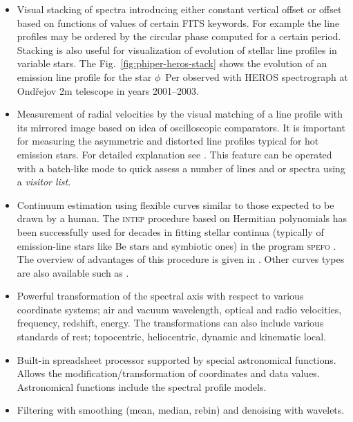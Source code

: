 \documentclass[final,authoryear,5p,times,twocolumn]{elsarticle}
\begin{document}
\begin{itemize}

\item Visual stacking of spectra introducing either constant vertical offset
  or offset based on functions of values of certain FITS keywords. For example
  the line profiles may be ordered by the circular phase computed for a
  certain period. Stacking is also useful for visualization of evolution of
  stellar line profiles in variable stars.  The
  Fig.~\ref{fig:phiper-heros-stack} shows the evolution of an emission line
  profile for the star $\phi$~Per observed with HEROS spectrograph at
  Ond\v{r}ejov 2m telescope in years 2001--2003.

\item Measurement of radial velocities by the visual matching of a line
  profile with its mirrored image based on idea of oscilloscopic comparators.
  It is important for measuring the asymmetric and distorted line profiles
  typical for hot emission stars. For detailed explanation see
  \citet{2007IAUS..240..486P}. This feature can be operated with a batch-like
  mode to quick assess a number of lines and or spectra using a \emph{visitor list}.

\item Continuum estimation using flexible curves similar to those expected to
  be drawn by a human. The \textsc{intep} procedure based on Hermitian polynomials
  \citep{1982PDAO...16...67H} has been successfully used for decades in
  fitting stellar continua (typically of emission-line stars like Be stars and
  symbiotic ones) in the program \textsc{spefo} \citep{1996ASPC..101..187S}. The
  overview of advantages of this procedure is given in
  \citet{2008asvo.proc...97S}. Other curves types are also available such as
  \citet{Akima:1970:NMI:321607.321609}.

\item Powerful transformation of the spectral axis with respect to various
  coordinate systems; air and vacuum wavelength, optical and radio velocities,
  frequency, redshift, energy. The transformations can also include various
  standards of rest; topocentric, heliocentric, dynamic and kinematic local.

\item Built-in spreadsheet processor supported by special astronomical
  functions. Allows the modification/transformation of coordinates and data
  values. Astronomical functions include the spectral profile models.

\item Filtering with smoothing (mean, median, rebin) and denoising with wavelets.


\end{itemize}
\end{document}
